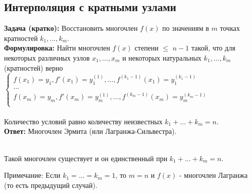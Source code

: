 \subsection{Интерполяция с кратными узлами}
\textbf{Задача (кратко):}
Восстановить многочлен $f(x)$ по значениям в $m$ точках кратностей $k_1,..., k_m$.\\
\textbf{Формулировка:}
Найти многочлен $f(x)$ степени $\leq$ $n-1$ такой, что для некоторых различных узлов $x_1,...,x_m$ и некоторых натуральных $k_1,...,k_m$ (кратностей) верно\\
$  
\left\{  
\begin{array}{lcl}  
f(x_1) = y_1, f'(x_1) = y_1^{(1)},...,f^{(k_1-1)}(x_1) = y_1^{(k_1-1)} \\  
...\\
f(x_m) = y_m, f'(x_m) = y_m^{(1)},...,f^{(k_m-1)}(x_m) = y_m^{(k_m-1)} \\
\end{array}   
\right.  
$
\\ \\
Количество условий равно количеству неизвестных $k_1+...+k_m = n$.\\
\textbf{Ответ:} Многочлен Эрмита (или Лагранжа-Сильвестра).\\
\\
\begin{statement}
Такой многочлен существует и он единственный при $k_1+...+k_m = n$.
\end{statement}
Примечание: Если $k_1 = ... = k_m = 1$, то $m = n$ и $f(x)$ - многочлен Лагранжа (то есть предыдущий случай).\\
